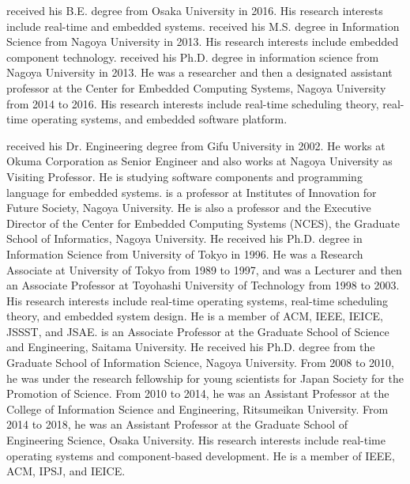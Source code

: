 \begin{biography}
{
received his B.E. degree from Osaka University in 2016.
His research interests include real-time and embedded systems\@.
}
{
received his M.S. degree in Information Science from Nagoya University in 2013.
His research interests include embedded component technology\@.
}
{
received his Ph.D. degree in information science from Nagoya University in 2013.
He was a researcher and then a designated assistant professor at the Center for Embedded Computing Systems, Nagoya University from 2014 to 2016.
His research interests include real-time scheduling theory, real-time operating systems, and embedded software platform\@.
}

{
received his Dr. Engineering degree from Gifu University in 2002.
He works at Okuma Corporation as Senior Engineer and also works at Nagoya University as Visiting Professor.
He is studying software components and programming language for embedded systems\@.
}
{
is a professor at Institutes of Innovation for Future Society, Nagoya University.
He is also a professor and the Executive Director of the Center for Embedded Computing Systems (NCES), the Graduate School of Informatics, Nagoya University.
He received his Ph.D. degree in Information Science from University of Tokyo in 1996.
He was a Research Associate at University of Tokyo from 1989 to 1997, and was a Lecturer and then an Associate Professor at Toyohashi University of Technology from 1998 to 2003.
His research interests include real-time operating systems, real-time scheduling theory, and embedded system design.
He is a member of ACM, IEEE, IEICE, JSSST, and JSAE\@.
}
{
is an Associate Professor at the Graduate School of Science and Engineering, Saitama University.
He received his Ph.D. degree from the Graduate School of Information Science, Nagoya University. 
From 2008 to 2010, he was under the research fellowship for young scientists for Japan Society for the Promotion of Science. 
From 2010 to 2014, he was an Assistant Professor at the College of Information Science and Engineering, Ritsumeikan University. 
From 2014 to 2018, he was an Assistant Professor at the Graduate School of Engineering Science, Osaka University. 
His research interests include real-time operating systems and component-based development.
He is a member of IEEE, ACM, IPSJ, and IEICE\@.
}


\end{biography}
